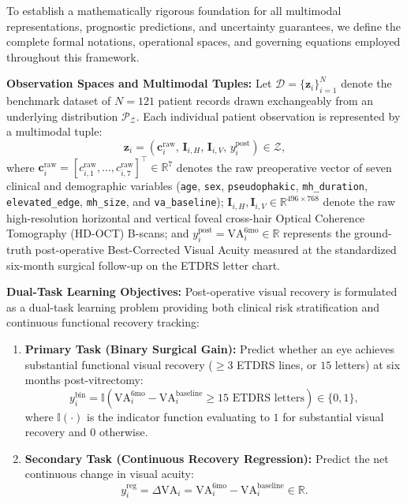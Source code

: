 \documentclass[preprint,12pt]{elsarticle}
\begin{document}
To establish a mathematically rigorous foundation for all multimodal representations, prognostic predictions, and uncertainty guarantees, we define the complete formal notations, operational spaces, and governing equations employed throughout this framework.

\noindent\textbf{Observation Spaces and Multimodal Tuples:} Let $\mathcal{D} = \{ \mathbf{z}_i \}_{i=1}^N$ denote the benchmark dataset of $N=121$ patient records drawn exchangeably from an underlying distribution $\mathcal{P}_{\mathcal{Z}}$. Each individual patient observation is represented by a multimodal tuple:
\begin{equation}
\mathbf{z}_i = \left( \mathbf{c}_i^{\text{raw}},\, \mathbf{I}_{i,H},\, \mathbf{I}_{i,V},\, y_i^{\text{post}} \right) \in \mathcal{Z},
\end{equation}
where $\mathbf{c}_i^{\text{raw}} = [c_{i,1}^{\text{raw}}, \dots, c_{i,7}^{\text{raw}}]^{\top} \in \mathbb{R}^7$ denotes the raw preoperative vector of seven clinical and demographic variables (\texttt{age}, \texttt{sex}, \texttt{pseudophakic}, \texttt{mh\_duration}, \texttt{elevated\_edge}, \texttt{mh\_size}, and \texttt{va\_baseline}); $\mathbf{I}_{i,H}, \mathbf{I}_{i,V} \in \mathbb{R}^{496 \times 768}$ denote the raw high-resolution horizontal and vertical foveal cross-hair Optical Coherence Tomography (HD-OCT) B-scans; and $y_i^{\text{post}} = \text{VA}_i^{6\text{mo}} \in \mathbb{R}$ represents the ground-truth post-operative Best-Corrected Visual Acuity measured at the standardized six-month surgical follow-up on the ETDRS letter chart.

\noindent\textbf{Dual-Task Learning Objectives:} Post-operative visual recovery is formulated as a dual-task learning problem providing both clinical risk stratification and continuous functional recovery tracking:
\begin{enumerate}
    \item \textbf{Primary Task (Binary Surgical Gain):} Predict whether an eye achieves substantial functional visual recovery ($\ge 3$ ETDRS lines, or $15$ letters) at six months post-vitrectomy:
    \begin{equation}
    y_i^{\text{bin}} = \mathbb{I}\left(\text{VA}_i^{6\text{mo}} - \text{VA}_i^{\text{baseline}} \ge 15 \text{ ETDRS letters}\right) \in \{0, 1\},
    \end{equation}
    where $\mathbb{I}(\cdot)$ is the indicator function evaluating to $1$ for substantial visual recovery and $0$ otherwise.
    \item \textbf{Secondary Task (Continuous Recovery Regression):} Predict the net continuous change in visual acuity:
    \begin{equation}
    y_i^{\text{reg}} = \Delta \text{VA}_i = \text{VA}_i^{6\text{mo}} - \text{VA}_i^{\text{baseline}} \in \mathbb{R}.
    \end{equation}
\end{enumerate}
\end{document}
